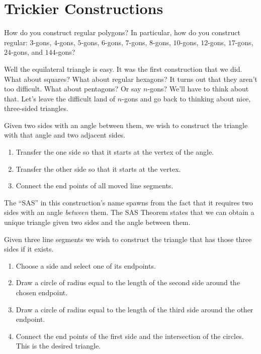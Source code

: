 \newpage

\section{Trickier Constructions}

\begin{ques} 
How do you construct regular polygons? In particular, how do you
construct regular: $3$-gons, $4$-gons, $5$-gons, $6$-gons, $7$-gons,
$8$-gons, $10$-gons, $12$-gons, $17$-gons, $24$-gons, and $144$-gons?
\end{ques}
\QM

Well the equilateral triangle is easy. It was the first construction
that we did. What about squares? What about regular hexagons? It turns
out that they aren't too difficult. What about pentagons? Or say
$n$-gons? We'll have to think about that. Let's leave the difficult
land of $n$-gons and go back to thinking about nice, three-sided
triangles.

\begin{con}  
Given two sides with an angle between them, we wish to construct the
triangle with that angle and two adjacent sides.
\begin{enumerate}
\item Transfer the one side so that it starts at the vertex of the
  angle.
\item Transfer the other side so that it starts at the vertex. 
\item Connect the end points of all moved line segments.
\end{enumerate}
\end{con}

The ``SAS'' in this construction's name spawns from the fact that it
requires two sides with an angle \textit{between} them. The SAS
Theorem states that we can obtain a unique triangle given two sides
and the angle between them.


\begin{con} 
Given three line segments we wish to construct the triangle that has
those three sides if it exists.
\begin{enumerate}
\item Choose a side and select one of its endpoints.
\item Draw a circle of radius equal to the length of the second side
  around the chosen endpoint.
\item Draw a circle of radius equal to the length of the third side
  around the other endpoint.
\item Connect the end points of the first side and the intersection of
  the circles. This is the desired triangle.
\end{enumerate}
\end{con}


